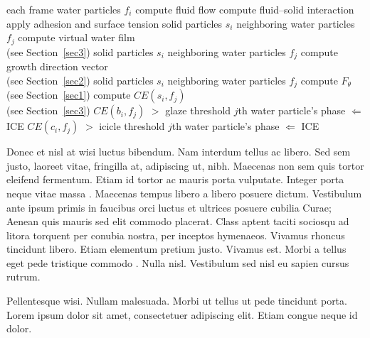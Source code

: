 \documentclass[ASNA,twocolumn]{USG} %
\begin{document}
{\begin{algorithm}
\caption{\enskip Pseudocode for our algorithm}\label{alg1}
\begin{algorithmic}
  \For each frame
  \For water particles $f_{i}$
  \State compute fluid flow \cite{Hirt1974}
  \State compute fluid--solid interaction \cite{Benson1992}
  \State apply adhesion and surface tension \cite{Margolin2003}
  \EndFor
   \For solid particles $s_{i}$
   \For neighboring water particles $f_{j}$
   \State compute virtual water film \\(see Section~\ref{sec3})
   \EndFor
   \EndFor
   \For solid particles $s_{i}$
   \For neighboring water particles $f_{j}$
   \State compute growth direction vector \\(see Section~\ref{sec2})
   \EndFor
   \EndFor
   \For solid particles $s_{i}$
   \For neighboring water particles $f_{j}$
   \State compute $F_{\theta}$ (see Section~\ref{sec1})
   \State compute $CE(s_{i},f_{j})$ \\(see Section~\ref{sec3})
   \If $CE(b_{i}, f_{j})$ $>$ glaze threshold
   \State $j$th water particle's phase $\Leftarrow$ ICE
   \EndIf
   \If $CE(c_{i}, f_{j})$ $>$ icicle threshold
   \State $j$th water particle's phase $\Leftarrow$ ICE
   \EndIf
   \EndFor
   \EndFor
  \EndFor
\end{algorithmic}
\end{algorithm}

Donec et nisl at wisi luctus bibendum. Nam interdum tellus ac libero. Sed sem justo, laoreet vitae, fringilla at,
adipiscing ut, nibh. Maecenas non sem quis tortor eleifend fermentum. Etiam id tortor ac mauris porta vulputate.
Integer porta neque vitae massa \cite{Hirt1974,Benson1992}.  Maecenas tempus libero a libero posuere dictum. Vestibulum ante ipsum primis in
faucibus orci luctus et ultrices posuere cubilia Curae; Aenean quis mauris sed elit commodo placerat. Class aptent
taciti sociosqu ad litora torquent per conubia nostra, per inceptos hymenaeos. Vivamus rhoncus tincidunt libero.
Etiam elementum pretium justo. Vivamus est. Morbi a tellus eget pede tristique commodo \cite{Benson1992}. Nulla nisl. Vestibulum
sed nisl eu sapien cursus rutrum.

Pellentesque wisi. Nullam malesuada. Morbi ut tellus ut pede tincidunt porta. Lorem ipsum dolor sit amet,
consectetuer adipiscing elit. Etiam congue neque id dolor.

}
\end{document}

